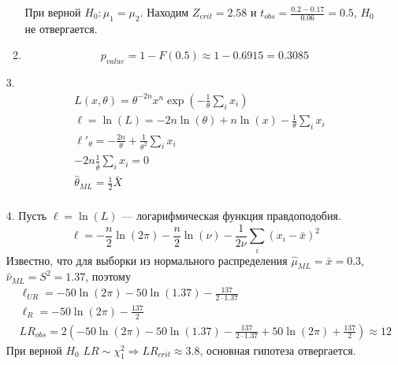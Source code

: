 \begin{enumerate}
\begin{enumerate}
При верной $H_0: \mu_1=\mu_2$.
Находим $Z_{crit} = 2.58$ и $t_{obs} =\frac{0.2-0.17}{0.06}= 0.5$, $H_0$ не отвергается.
\item
\[
p_{value} = 1 - F(0.5) \approx 1 - 0.6915 = 0.3085
\]
\end{enumerate}

\item[3.]
\begin{align*}
&L(x, \theta) = \theta^{-2n} x^n \exp \left(-\frac{1}{\theta}\sum_ix_i\right) \\
&\ell=\ln(L)=-2n\ln(\theta)+n\ln(x)-\frac{1}{\theta}\sum_ix_i \\
&\ell'_{\theta}=-\frac{2n}{\theta} + \frac{1}{\theta^2}\sum_ix_i \\
&-2n\frac{1}{\hat{\theta}}\sum_ix_i=0 \\
&\hat{\theta}_{ML}=\frac{1}{2}\bar{X} \\
\end{align*}


\item[4.]
Пусть $\ell=\ln(L)$ — логарифмическая функция правдоподобия.
\[
\ell=-\frac{n}{2}\ln(2\pi)-\frac{n}{2}\ln(\nu)-\frac{1}{2\nu}\sum_i(x_i-\bar{x})^2
\]
Известно, что для выборки из нормального распределения
$\hat{\mu}_{ML} = \bar{x} = 0.3$, $\hat{\nu}_{ML} = S^2 = 1.37$, поэтому
\begin{align*}
&\ell_{UR} = -50\ln(2\pi) - 50\ln(1.37)-\frac{137}{2 \cdot 1.37} \\
&\ell_{R} = -50\ln(2\pi) - \frac{137}{2} \\
& LR_{obs}=2\left(-50\ln(2\pi)-50\ln(1.37)-\frac{137}{2\cdot1.37}+50\ln(2\pi)+\frac{137}{2}\right) \approx 12
\end{align*}
При верной $H_0$ $LR\sim\chi^2_1 \Rightarrow LR_{crit}\approx3.8$, основная гипотеза отвергается.


\end{enumerate}

